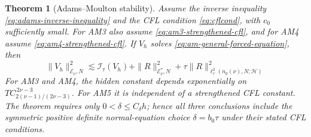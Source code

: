 \documentclass[10pt,a4paper]{amsart}
\newtheorem{thm}{Theorem}
\begin{document}
\begin{thm}[Adams--Moulton stability]
\label{thm:adams-moulton-stability}
Assume the inverse inequality \eqref{eq:adams-inverse-inequality} and the CFL
condition \eqref{eq:cflcond}, with \(c_0\) sufficiently small. For AM3 also
assume \eqref{eq:am3-strengthened-cfl}, and for AM4 assume
\eqref{eq:am4-strengthened-cfl}. If \(V_h\) solves
\eqref{eq:am-general-forced-equation}, then
\begin{equation}
\|V_h\|_{\mathcal E_\nu,N}^2
\lesssim\mathcal I_{\tau}(V_h)
+\|R\|_{\mathcal E_\nu^*,N}^2
+\tau\|R\|_{\ell_{\tau}^2(n_0(\nu),N;\mathcal H)}^2
\label{eq:adams-stability-right-hand-side}
\end{equation}
For AM3 and AM4, the hidden constant depends exponentially on
\(TC_{2(\nu-1)/(2\nu-3)}^{\,2\nu-3}\). For AM5 it is independent of a
strengthened CFL constant.
The theorem requires only \(0<\delta\le C_{\delta}h\); hence all three
conclusions include the symmetric positive definite normal-equation choice
\(\delta=b_0\tau\) under
their stated CFL conditions.
\end{thm}
\end{document}

